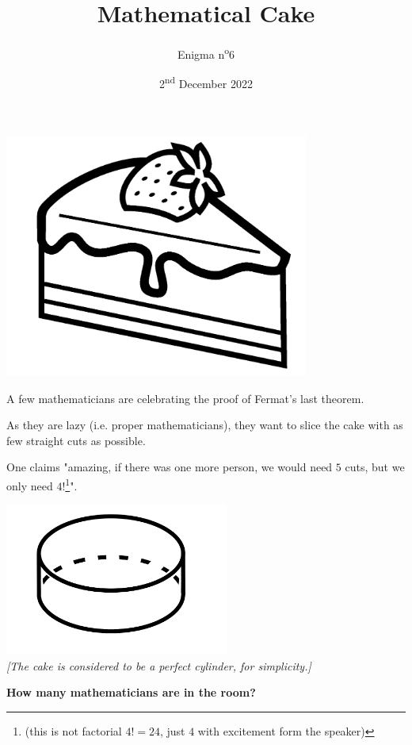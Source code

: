 \documentclass[a4paper, top=10mm]{article}
\title{\textbf{\huge{Mathematical Cake}}}
\author{Enigma n\textsuperscript{o}6}
\date{2\textsuperscript{nd} December 2022}
\begin{document}
	\maketitle
	
	\begin{center}
		\includegraphics[height=8cm]{06piece_of_cake.png}
	\end{center}
	
	A few mathematicians are celebrating the proof of Fermat's last theorem.
	
	As they are lazy (i.e. proper mathematicians), they want to slice the cake with as few straight cuts as possible.
	
	One claims "amazing, if there was one more person, we would need $5$ cuts, but we only need $4$!\footnote{(this is not factorial $4!=24$, just $4$ with excitement form the speaker)}".
	
	\vspace{1cm}
	
	\begin{center}
		\includegraphics[height=5cm]{06cylinder.png}\\
		\textit{[The cake is considered to be a perfect cylinder, for simplicity.]}
	\end{center}
	
	\vspace{1cm}
	
	\textbf{How many mathematicians are in the room?}
	
\end{document}
